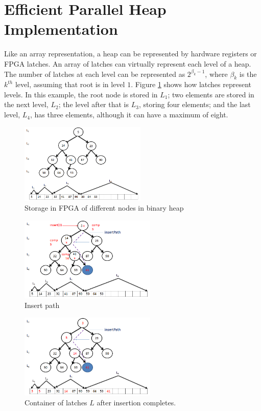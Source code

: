 \section{Efficient Parallel Heap Implementation}
\label{s:impl}

Like an array representation, a heap can be represented by hardware registers or FPGA latches.
An array of latches can virtually represent each level of a heap.
The number of latches at each level can be represented as $2^{\beta_k-1}$, where $\beta_k$ is the $k^{th}$ level, assuming that root is in level $1$.
Figure \ref{fig5} shows how latches represent levels.
In this example, the root node is stored in $L_1$; two elements are stored in the next level, $L_2$; the level after that is $L_3$, storing four elements; and the last level, $L_4$, has three elements, although it can have a maximum of eight.

\begin{figure}[!ht]
  \centering
  \includegraphics[width=6cm]{fig/5.png}
      \caption{Storage in FPGA of different nodes in binary heap}
    \label{fig5}
\end{figure}

\begin{figure}[!ht]
  \centering
  \includegraphics[width=6.5cm]{fig/6.png}
      \caption{Insert path}
    \label{fig6}
\end{figure}

\begin{figure}[!ht]
  \centering
  \includegraphics[width=6.5cm]{fig/7.png}
      \caption{Container of latches $L$ after insertion completes.}
    \label{fig7}
\end{figure}

